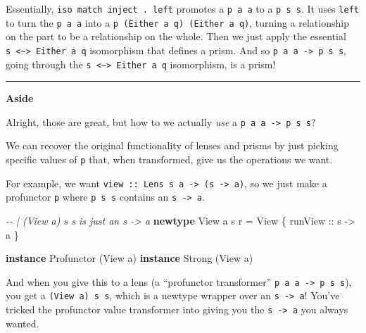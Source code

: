 \documentclass[]{article}
\newenvironment{Shaded}{}{}
\newcommand{\CommentTok}[1]{\textcolor[rgb]{0.38,0.63,0.69}{\textit{#1}}}
\newcommand{\DataTypeTok}[1]{\textcolor[rgb]{0.56,0.13,0.00}{#1}}
\newcommand{\KeywordTok}[1]{\textcolor[rgb]{0.00,0.44,0.13}{\textbf{#1}}}
\newcommand{\NormalTok}[1]{#1}
\newcommand{\OtherTok}[1]{\textcolor[rgb]{0.00,0.44,0.13}{#1}}
\begin{document}
Essentially, \texttt{iso\ match\ inject\ .\ left\textquotesingle{}} promotes a
\texttt{p\ a\ a} to a \texttt{p\ s\ s}. It uses \texttt{left\textquotesingle{}}
to turn the \texttt{p\ a\ a} into a \texttt{p\ (Either\ a\ q)\ (Either\ a\ q)},
turning a relationship on the part to be a relationship on the whole. Then we
just apply the essential
\texttt{s\ \textless{}\textasciitilde{}\textgreater{}\ Either\ a\ q} isomorphism
that defines a prism. And so \texttt{p\ a\ a\ -\textgreater{}\ p\ s\ s}, going
through the \texttt{s\ \textless{}\textasciitilde{}\textgreater{}\ Either\ a\ q}
isomorphism, is a prism!

\begin{center}\rule{0.5\linewidth}{0.5pt}\end{center}

\textbf{Aside}

Alright, those are great, but how to we actually \emph{use} a
\texttt{p\ a\ a\ -\textgreater{}\ p\ s\ s}?

We can recover the original functionality of lenses and prisms by just picking
specific values of \texttt{p} that, when transformed, give us the operations we
want.

For example, we want
\texttt{view\ ::\ Lens\textquotesingle{}\ s\ a\ -\textgreater{}\ (s\ -\textgreater{}\ a)},
so we just make a profunctor \texttt{p} where \texttt{p\ s\ s} contains an
\texttt{s\ -\textgreater{}\ a}.

\begin{Shaded}
\begin{Highlighting}[]
\CommentTok{{-}{-} | \textasciigrave{}(View a) s s\textasciigrave{} is just an \textasciigrave{}s {-}\textgreater{} a\textasciigrave{}}
\KeywordTok{newtype} \DataTypeTok{View}\NormalTok{ a s r }\OtherTok{=} \DataTypeTok{View}\NormalTok{ \{}\OtherTok{ runView ::}\NormalTok{ s }\OtherTok{{-}\textgreater{}}\NormalTok{ a \}}

\KeywordTok{instance} \DataTypeTok{Profunctor}\NormalTok{ (}\DataTypeTok{View}\NormalTok{ a)}
\KeywordTok{instance} \DataTypeTok{Strong}\NormalTok{ (}\DataTypeTok{View}\NormalTok{ a)}
\end{Highlighting}
\end{Shaded}

And when you give this to a lens (a ``profunctor transformer''
\texttt{p\ a\ a\ -\textgreater{}\ p\ s\ s}), you get a \texttt{(View\ a)\ s\ s},
which is a newtype wrapper over an \texttt{s\ -\textgreater{}\ a}! You've
tricked the profunctor value transformer into giving you the
\texttt{s\ -\textgreater{}\ a} you always wanted.
\end{document}
